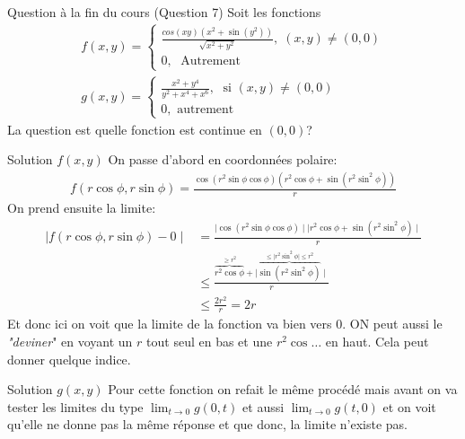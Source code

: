 \begin{parag}{Question à la fin du cours (Question 7)}
Soit les fonctions \begin{align*}
    f(x, y) = \begin{cases}
        \frac{cos(xy)(x^2 + \sin(y^2))}{\sqrt{x^2 + y^2}}, \; (x, y) \neq (0, 0)\\ 
        0 , \; \text{ Autrement}
    \end{cases} \\
    g(x, y) = \begin{cases}
        \frac{x^2 + y^4}{y^2 + x^4 + x^6}, \; \text{ si } (x, y) \neq (0, 0)\\
        0, \text{ autrement}
    \end{cases}
\end{align*}
La question est quelle fonction est continue en $(0, 0)$?
\begin{subparag}{Solution $f(x, y)$}
    On passe d'abord en coordonnées polaire:
    \begin{align*}
        f(r\cos\phi, r\sin\phi) = \frac{\cos(r^2\sin\phi\cos\phi)(r^2\cos\phi + \sin(r^2\sin^2\phi))}{r}
    \end{align*}
    On prend ensuite la limite:
    \begin{align*}
        \mid f(r\cos\phi, r\sin\phi) - 0 \mid &= \frac{ \mid \cos(r^2\sin\phi\cos\phi) \mid \mid r^2\cos\phi + \sin(r^2\sin^2\phi) \mid}{r}\\
                                              &\leq \frac{ \overbrace{r^2\cos\phi}^{ \geq r^2} + \mid \overbrace{\sin(r^2\sin^2\phi)}^{\leq \mid r^2\sin^2\phi \mid \leq r^2} \mid}{r}\\
                                              &\leq \frac{2r^2}{r} = 2r
    \end{align*}
    Et donc ici on voit que la limite de la fonction va bien vers $0$. ON peut aussi le \textit{"deviner}" en voyant un $r$ tout seul en bas et une $r^2\cos \dots$ en haut. Cela peut donner quelque indice.
\end{subparag}
\begin{subparag}{Solution $g(x, y)$}
    Pour cette fonction on refait le même procédé mais avant on va tester les limites du type $\lim_{t \to 0}g(0, t)$ et aussi $\lim_{t \to 0}g(t, 0)$ et on voit qu'elle ne donne pas la même réponse et que donc, la limite n'existe pas. 
    
\end{subparag}
\end{parag}


 
 
        

